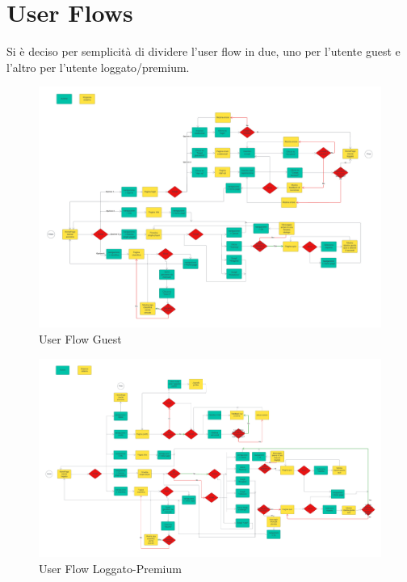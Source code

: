 \section{User Flows}
Si è deciso per semplicità di dividere l'user flow in due, uno per l'utente guest e l'altro per l'utente loggato/premium.

\begin{figure}[!h]
\centering
\includegraphics[scale=0.11]{images/user_flow_guest.png}
\caption{User Flow Guest}
\label{fig:user_flow_guest}
\end{figure}
\noindent

\begin{figure}[!h]
\centering
\includegraphics[scale=0.11]{images/user_flow_loggato-premium.png}
\caption{User Flow Loggato-Premium}
\label{fig:user_flow_loggato-premium}
\end{figure}
\noindent